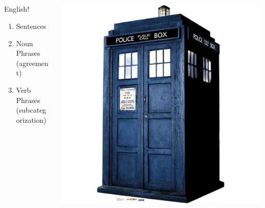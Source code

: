 \documentclass[9pt,xcolor=pdftex,dvipsnames,table]{beamer}
\begin{document}
\subsection{}
\begin{frame}{}

\begin{columns}[c] %
     \begin{column}[]{3.4cm} %
              {\Huge English! }
              \vspace{.5cm}
              \begin{enumerate}
                   \item Sentences
                   \item Noun Phrases
                  	 \hspace{.75cm}(agreement)
                   \item Verb Phrases
                  	 \hspace{.75cm}(subcategorization)
              \end{enumerate}

     \end{column}
     \begin{column}[]{7cm} %
              \includegraphics[scale=.3]{tardis}
     \end{column}
\end{columns}
\end{frame}
\end{document}
